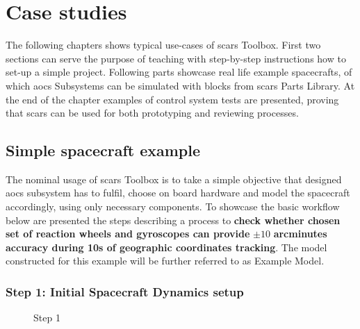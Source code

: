 \section{Case studies}\label{sec:examples}
    The following chapters shows typical use-cases of \ac{scars} Toolbox. First two sections can serve the purpose of teaching with step-by-step instructions how to set-up a simple project. Following parts showcase real life example spacecrafts, of which \ac{aocs} Subsystems can be simulated with blocks from \ac{scars} Parts Library. At the end of the chapter examples of control system tests are presented, proving that \ac{scars} can be used for both prototyping and reviewing processes.


    \subsection{Simple spacecraft example}\label{sec:simple_spacecraft}
        The nominal usage of \ac{scars} Toolbox is to take a simple objective that designed \ac{aocs} subsystem has to fulfil, choose on board hardware and model the spacecraft accordingly, using only necessary components. To showcase the basic workflow below are presented the steps describing a process to \textbf{check whether chosen set of reaction wheels and gyroscopes can provide} $\pm10$ \textbf{arcminutes accuracy during 10s of geographic coordinates tracking}. The model constructed for this example will be further referred to as Example Model. 

        \subsubsection*{Step 1: Initial Spacecraft Dynamics setup}
            \begin{figure}[H]
                \centering
                \qquad
                \caption{Step 1}%
                \label{fig:step1}%
            \end{figure}

